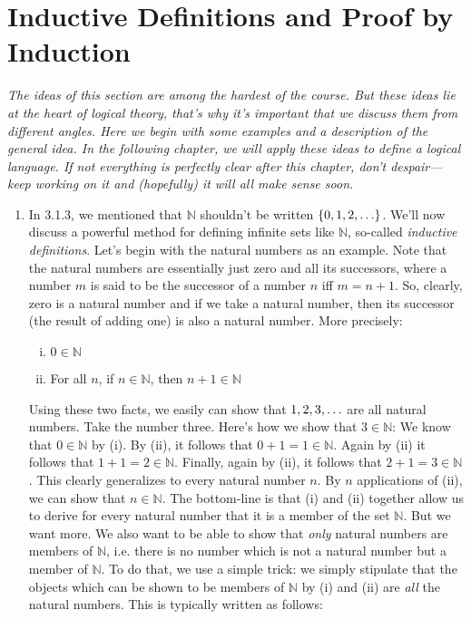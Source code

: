\section{Inductive Definitions and Proof by Induction}

\emph{The ideas of this section are among the hardest of the course. But these ideas lie at the heart of logical theory, that's why it's important that we discuss them from different angles. Here we begin with some examples and a description of the general idea. In the following chapter, we will apply these ideas to define a logical language. If not everything is perfectly clear after this chapter, don't despair---keep working on it and (hopefully) it will all make sense soon.}

\begin{enumerate}[{\thesection}.1]

	\item In 3.1.3, we mentioned that $\mathbb{N}$ shouldn't be written $\{0,1,2,\mathellipsis\}$. We'll now discuss a powerful method for defining infinite sets like $\mathbb{N}$, so-called \emph{inductive definitions}. Let's begin with the natural numbers as an example. Note that the natural numbers are essentially just zero and all its successors, where a number $m$ is said to be the successor of a number $n$ iff $m=n+1$. So, clearly, zero is a natural number and if we take a natural  number, then its successor (the result of adding one) is also a natural number. More precisely:
	\begin{enumerate}[(i)]
	
		\item $0\in \mathbb{N}$
		
		\item For all $n$, if $n\in\mathbb{N}$, then $n+1\in \mathbb{N}$
	
	\end{enumerate}
	
	Using these two facts, we easily can show that $1,2,3, \mathellipsis$ are all natural numbers. Take the number three. Here's how we show that $3\in \mathbb{N}$: We know that $0\in\mathbb{N}$ by (i). By (ii), it follows that $0+1=1\in\mathbb{N}$. Again by (ii) it follows that $1+1=2\in\mathbb{N}$. Finally, again by (ii), it follows that $2+1=3\in \mathbb{N}$. This clearly generalizes to every natural number $n$. By $n$ applications of (ii), we can show that $n\in\mathbb{N}$. The bottom-line is that (i) and (ii) together allow us to derive for every natural number that it is a member of the set $\mathbb{N}$. But we want more. We also want to be able to show that \emph{only} natural numbers are members of $\mathbb{N}$, i.e. there is no number which is not a natural number but a member of $\mathbb{N}$.	 To do that, we use a simple trick: we simply stipulate that the objects which can be shown to be members of $\mathbb{N}$ by (i) and (ii) are \emph{all} the natural numbers. This is typically written as follows:
	\begin{enumerate}[(i)]
	

\end{enumerate}
\end{enumerate}
